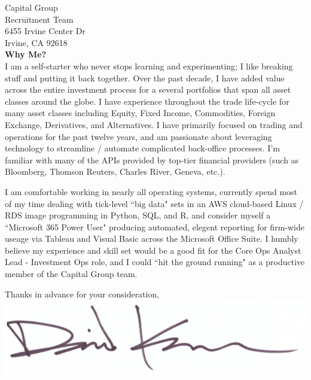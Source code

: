 \documentclass{letter}
\begin{document}
\begin{letter}{
  Capital Group \\
  Recruitment Team \\ 
  6455 Irvine Center Dr \\
  Irvine, CA 92618 \\
}
\textbf{Why Me?} \\
I am a self-starter who never stops learning and experimenting;
I like breaking stuff and putting it back together. Over the past
decade, I have added value across the entire investment process for a several
portfolios that span all asset classes around the globe. I have experience
throughout the trade life-cycle for many asset classes including Equity, Fixed Income,
Commodities, Foreign Exchange, Derivatives, and Alternatives. I have primarily
focused on trading and operations for the past twelve years, and am passionate
about leveraging technology to streamline / automate complicated back-office
processes. I'm familiar with many of the APIs provided by top-tier financial
providers (such as Bloomberg, Thomson Reuters, Charles River, Geneva, etc.).

\newpage
 
I am comfortable working in nearly all operating systems, currently
spend most of my time dealing with tick-level ``big data" sets in an AWS cloud-based
Linux / RDS image programming in Python, SQL, and R, and consider myself a 
``Microsoft 365 Power User" producing automated, elegent reporting for firm-wide
useage via Tableau and Visual Basic across the Microsoft Office Suite. 
I humbly believe my experience and skill set would be a good fit for the Core
Ops Analyst Lead - Investment Ops role, and I could ``hit the ground running"
as a productive member of the Capital Group team.

\closing{
  Thanks in advance for your consideration, \\
  \vspace{.33in}
  \includegraphics[scale=0.33]{signature.png}
}

\end{letter}
\end{document}

